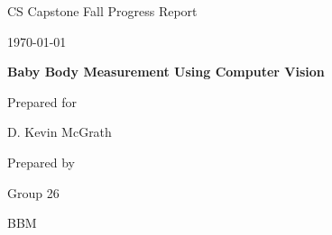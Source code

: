 \documentclass[onecolumn, draftclsnofoot,10pt, compsoc]{IEEEtran}
\def \CapstoneTeamName{		BBM}
\def \CapstoneTeamNumber{		26}
\def \GroupMemberOne{			Aidan Grimshaw}
\def \GroupMemberTwo{			Khoa Tran}
\def \GroupMemberThree{			Aaron Leenknecht}
\def \CapstoneProjectName{		Baby Body Measurement Using Computer Vision}
\def \CapstoneSponsorPerson{		D. Kevin McGrath}
\def \DocType{		%
				Fall Progress Report
				}
\newcommand{\NameSigPair}[1]{\par
\makebox[2.75in][r]{#1} \hfil 	\makebox[3.25in]{\makebox[2.25in]{\hrulefill} \hfill		\makebox[.75in]{\hrulefill}}
\par\vspace{-12pt} \textit{\tiny\noindent
\makebox[2.75in]{} \hfil		\makebox[3.25in]{\makebox[2.25in][r]{Signature} \hfill	\makebox[.75in][r]{Date}}}}
\renewcommand{\NameSigPair}[1]{#1}
\begin{document}
\begin{titlepage}
    \begin{singlespace}
        \hfill 
        \par\vspace{.2in}
        \centering
        \scshape{
            \huge CS Capstone \DocType \par
            {\large\today}\par
            \vspace{.5in}
            \textbf{\Huge\CapstoneProjectName}\par
            \vspace{10mm}
            {\large Prepared for}\par
            \vspace{5mm}
            {\Large\NameSigPair{\CapstoneSponsorPerson}\par}
            \vspace{5mm}
            {\large Prepared by }\par
            \vspace{5mm}
            Group\CapstoneTeamNumber\par
            \CapstoneTeamName\par 
            \vspace{5pt}
            {\Large
                
}}
\end{singlespace}
\end{titlepage}
\end{document}
